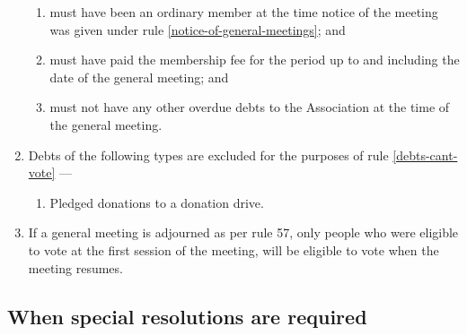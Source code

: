 \documentclass[../constitution.tex]{subfiles}
\begin{document}
\begin{enumerate}
        \begin{enumerate}
          \item must have been an ordinary member at the time notice of the meeting was given under rule \ref{notice-of-general-meetings}; and
          \item must have paid the membership fee for the period up to and including the date of the general meeting; and
          \item must not have any other overdue debts to the Association at the time of the general meeting. \label{debts-cant-vote}
        \end{enumerate}

  \item Debts of the following types are excluded for the purposes of rule \ref{debts-cant-vote} ---
        \begin{enumerate}
          \item Pledged donations to a donation drive.
        \end{enumerate}

  \item If a general meeting is adjourned as per rule 57, only people who were eligible to vote at the first session of the meeting, will be eligible to vote when the meeting resumes.

\end{enumerate}

\hypertarget{when-special-resolutions-are-required}{%
  \subsection{When special resolutions are required}\label{when-special-resolutions-are-required}}
\end{document}
